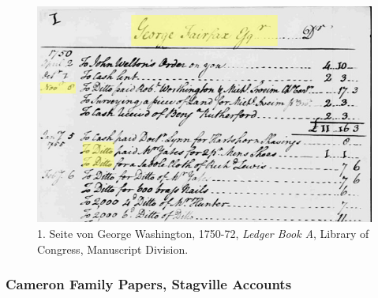 \documentclass[12pt,a4paper]{article}
\begin{document}
\begin{figure}[H]
\centering
	\includegraphics[width=1\textwidth]{img/washington.png}  
    \caption[1. Seite von George Washington, 1750-72, \textit{Ledger Book A}, Library of Congress, Manuscript Division, STERTZER Jennifer: \protect\url{http://doi.org/10.16995/dscn.57}]{1. Seite von George Washington, 1750-72, \textit{Ledger Book A}, Library of Congress, Manuscript Division.} \label{fig:washington}
\end{figure}


\subsubsection{Cameron Family Papers, Stagville Accounts}
\end{document}
